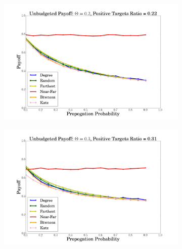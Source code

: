  \begin{figure}
  \begin{subfigure}{\linewidth}
  \includegraphics[width=1\textwidth]{../plots/unbudgeted/theta=2.png}
  \end{subfigure}\par\medskip
  \begin{subfigure}{\linewidth}
\includegraphics[width=1\textwidth]{../plots/unbudgeted/theta=3.png}
  \end{subfigure}\par\medskip
  

\end{figure}
